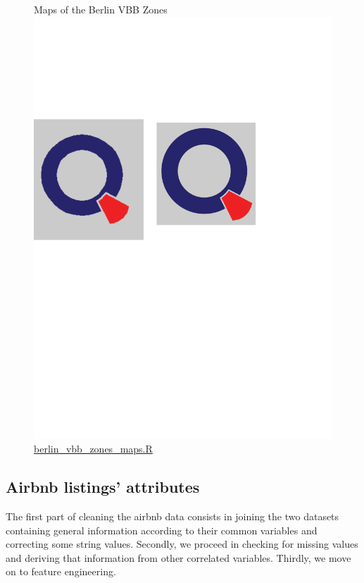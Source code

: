 \begin{figure}[H]
\caption{Maps of the Berlin VBB Zones \protect\includegraphics[scale=0.05]{qletlogo.pdf} {\href{https://github.com/silvia-ventoruzzo/SPL-WISE-2018/blob/master/Berlin_VBB_Zones/berlin_vbb_zones_maps.R}{berlin\_vbb\_zones\_maps.R}}}
\centering
\end{figure}

\subsection{Airbnb listings' attributes}\label{subsec:airbnb}

The first part of cleaning the airbnb data consists in joining the two datasets containing general information according to their common variables and correcting some string values. Secondly, we proceed in checking for missing values and deriving that information from other correlated variables. Thirdly, we move on to feature engineering.

